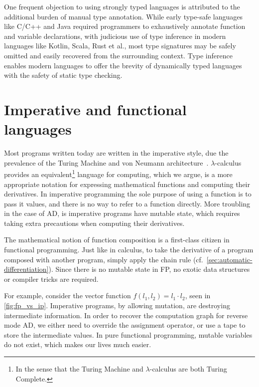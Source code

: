 \documentclass[12pt,initial,twoside,maitrise]{dms}
\numberwithin{equation}{section}
\numberwithin{table}{chapter}
\numberwithin{figure}{chapter}
\begin{document}
One frequent objection to using strongly typed languages is attributed to the additional burden of manual type annotation. While early type-safe languages like C/C++ and Java required programmers to exhaustively annotate function and variable declarations, with judicious use of type inference in modern languages like Kotlin, Scala, Rust et al., most type signatures may be safely omitted and easily recovered from the surrounding context. Type inference enables modern languages to offer the brevity of dynamically typed languages with the safety of static type checking.

\section{Imperative and functional languages}

Most programs written today are written in the imperative style, due the prevalence of the Turing Machine and von Neumann architecture~\citep{backus2007can}. $\lambda$-calculus provides an equivalent\footnote{In the sense that the Turing Machine and $\lambda$-calculus are both Turing Complete.} language for computing, which we argue, is a more appropriate notation for expressing mathematical functions and computing their derivatives. In imperative programming the sole purpose of using a function is to pass it values, and there is no way to refer to a function directly. More troubling in the case of AD, is imperative programs have mutable state, which requires taking extra precautions when computing their derivatives.

The mathematical notion of function composition is a first-class citizen in functional programming. Just like in calculus, to take the derivative of a program composed with another program, simply apply the chain rule (cf.~\autoref{sec:automatic-differentiation}). Since there is no mutable state in FP, no exotic data structures or compiler tricks are required.

For example, consider the vector function $f(l_1, l_2) = l_1 \cdot l_2$, seen in \autoref{fig:fp_vs_ip}. Imperative programs, by allowing mutation, are destroying intermediate information. In order to recover the computation graph for reverse mode AD, we either need to override the assignment operator, or use a tape to store the intermediate values. In pure functional programming, mutable variables do not exist, which makes our lives much easier.
\end{document}
